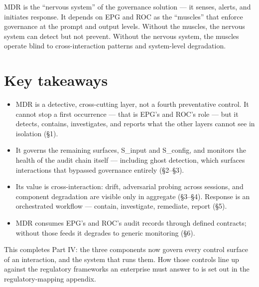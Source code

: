 MDR is the ``nervous system'' of the governance solution --- it senses, alerts, and initiates response. It depends on EPG and ROC as the ``muscles'' that enforce governance at the prompt and output levels. Without the muscles, the nervous system can detect but not prevent. Without the nervous system, the muscles operate blind to cross-interaction patterns and system-level degradation.



\section{Key takeaways}


\begin{itemize}
  \item MDR is a detective, cross-cutting layer, not a fourth preventative control. It cannot stop a first occurrence --- that is EPG's and ROC's role --- but it detects, contains, investigates, and reports what the other layers cannot see in isolation (\S{}1).
  \item It governs the remaining surfaces, S\_\allowbreak{}input and S\_\allowbreak{}config, and monitors the health of the audit chain itself --- including ghost detection, which surfaces interactions that bypassed governance entirely (\S{}2--\S{}3).
  \item Its value is cross-interaction: drift, adversarial probing across sessions, and component degradation are visible only in aggregate (\S{}3--\S{}4). Response is an orchestrated workflow --- contain, investigate, remediate, report (\S{}5).
  \item MDR consumes EPG's and ROC's audit records through defined contracts; without those feeds it degrades to generic monitoring (\S{}6).
\end{itemize}


This completes Part IV: the three components now govern every control surface of an interaction, and the system that runs them. How those controls line up against the regulatory frameworks an enterprise must answer to is set out in the regulatory-mapping appendix.
